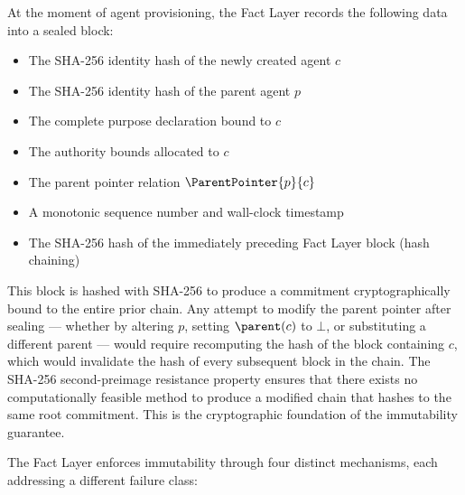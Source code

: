 At the moment of agent provisioning, the Fact Layer records the following data into a sealed block:

\begin{itemize}
    \item The SHA-256 identity hash of the newly created agent $c$
    \item The SHA-256 identity hash of the parent agent $p$
    \item The complete purpose declaration bound to $c$
    \item The authority bounds allocated to $c$
    \item The parent pointer relation $\ParentPointer{p}{c}$
    \item A monotonic sequence number and wall-clock timestamp
    \item The SHA-256 hash of the immediately preceding Fact Layer block (hash chaining)
\end{itemize}

This block is hashed with SHA-256 to produce a commitment cryptographically bound to the entire prior chain. Any attempt to modify the parent pointer after sealing — whether by altering $p$, setting $\parent(c)$ to $\bot$, or substituting a different parent — would require recomputing the hash of the block containing $c$, which would invalidate the hash of every subsequent block in the chain. The SHA-256 second-preimage resistance property ensures that there exists no computationally feasible method to produce a modified chain that hashes to the same root commitment. This is the cryptographic foundation of the immutability guarantee.

The Fact Layer enforces immutability through four distinct mechanisms, each addressing a different failure class:

